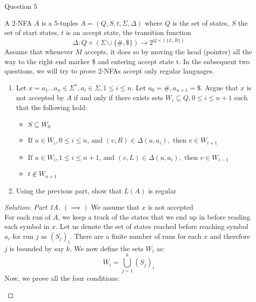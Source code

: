 \begin{solution}{Question 5}\label{ques:5}
    \begin{question}
    A 2-NFA $A$ is a 5-tuples $A=(Q,S,t,\Sigma,\Delta)$ where $Q$ is the set of states, $S$ the set of start states, $t$ is an accept state, the transition function
    $$\Delta: Q \times (\Sigma \cup \{\#, \$\}) \to 2^{Q \times (\{L,R\}) } $$
    Assume that whenever $M$ accepts, it does so by moving the head (pointer) all the way to the right end marker \$ and entering accept state t. In the subsequent two questions, we will try to prove 2-NFAs accept only regular languages.
    
    \begin{enumerate}
        \item Let $x = a_1\dots a_n \in \Sigma^*, a_i \in \Sigma, 1 \leq i \leq n.$ Let $a_0 = \#, a_{n+1} = \$.$ Argue that $x$ is not accepted by $A$ if and only if there exists sets $W_i \subseteq Q, 0 \leq i \leq n+1$ such that the following hold:
        \begin{itemize}
            \item $S \subseteq W_0$ \label{1}
            \item If $u \in W_i, 0 \leq i \leq n \text{, and } (v,R) \in \Delta (u,a_i), \text{ then } v \in W_{i+1}$
            \item If $u \in W_i, 1 \leq i \leq n+1 \text{, and } (v,L) \in \Delta (u,a_i), \text{ then } v \in W_{i-1}$
            \item $t \not\in W_{n+1}$
        \end{itemize}
        \item Using the previous part, show that $L(A)$ is regular
    \end{enumerate}
    \end{question}
    \tcblower{}
    \begin{proof}[Solution: Part 1A]
    $(\implies)$ We assume that $x$ is not accepted\\
    For each run of $A$, we keep a track of the states that we end up in before reading each symbol in $x$. Let us denote the set of states reached before reaching symbol $a_i$ for run $j$ as $(S_j)_i$. There are a finite number of runs for each $x$ and therefore $j$ is bounded by say $k$. We now define the sets $W_i$ as:
    \begin{equation}
        W_i = \bigcup_{j=1}^k (S_j)_i
    \end{equation}
    Now, we prove all the four conditions:
    \begin{enumerate}

\end{enumerate}
\end{proof}
\end{solution}

